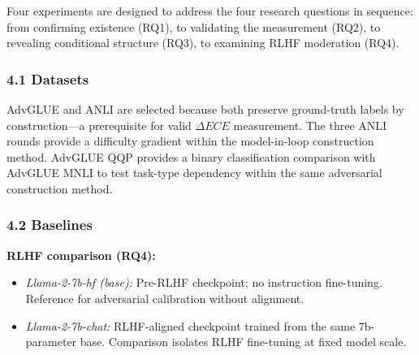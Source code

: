 
Four experiments are designed to address the four research questions in sequence: from confirming existence (RQ1), to validating the measurement (RQ2), to revealing conditional structure (RQ3), to examining RLHF moderation (RQ4).

\subsubsection{4.1 Datasets}

\begin{table}[htbp]
\centering
{}
\end{table}

AdvGLUE \citep{Wang2021AdvGLUE} and ANLI \citep{Nie2020Adversarial} are selected because both preserve ground-truth labels by construction---a prerequisite for valid $\Delta ECE$ measurement. The three ANLI rounds provide a difficulty gradient within the model-in-loop construction method. AdvGLUE QQP provides a binary classification comparison with AdvGLUE MNLI to test task-type dependency within the same adversarial construction method.

\subsubsection{4.2 Baselines}

\textbf{RLHF comparison (RQ4):}
\begin{itemize}
\item \textit{Llama-2-7b-hf (base):} Pre-RLHF checkpoint; no instruction fine-tuning. Reference for adversarial calibration without alignment.
\item \textit{Llama-2-7b-chat:} RLHF-aligned checkpoint trained from the same 7b-parameter base. Comparison isolates RLHF fine-tuning at fixed model scale.
\end{itemize}

